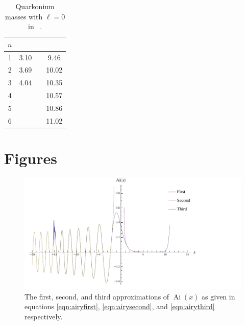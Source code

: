 \documentclass[]{article}
\newcommand{\Ai}[1]{\ensuremath{\operatorname{Ai}({#1})}}
\begin{document}
\begin{table}[H]
	\begin{center}
		\begin{tabular}{ c c c c }
			$n$ & \ccbar & & \bbbar\\
			\hline
			1 & 3.10 & & 9.46 \\
			2 & 3.69 & & 10.02\\
			3 & 4.04 & & 10.35\\
			4 &      & & 10.57\\
			5 &      & & 10.86\\
			6 &      & & 11.02\\
		\end{tabular}
		\caption{Quarkonium masses with $\ell = 0$ in \GeV~\cite{ref:gdaniell}.}
		\label{tab:mesonmasses}
	\end{center}  
\end{table}



\section{Figures}\label{sec:figures}

\begin{figure}[H]
	\hspace*{-0.15\textwidth}
	\centering
	\includegraphics[scale=1.3]{approximations}
	\caption{The first, second, and third approximations of \Ai{x} as given in equations \ref{eqn:airyfirst}, \ref{eqn:airysecond}, and \ref{eqn:airythird} respectively.}
	\label{fig:approximations}
\end{figure}
\end{document}
